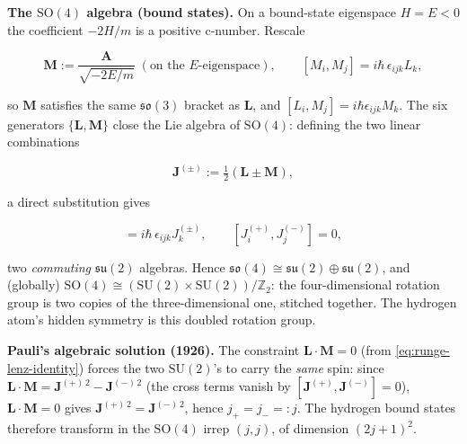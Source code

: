 \medskip\noindent\textbf{The $\mathrm{SO}(4)$ algebra (bound states).} On a bound-state eigenspace $H=E<0$ the coefficient $-2H/m$ is a positive c-number. Rescale
\begin{linenomath}
\begin{equation}
\bm M:=\frac{\bm A}{\sqrt{-2E/m}}\;(\text{on the }E\text{-eigenspace}),\qquad
[M_{i},M_{j}]=i\hbar\,\epsilon_{ijk}L_{k},
\label{eq:so4-rescale}
\end{equation}
\end{linenomath}
so $\bm M$ satisfies the same $\mathfrak{so}(3)$ bracket as $\bm L$, and $[L_{i},M_{j}]=i\hbar\epsilon_{ijk}M_{k}$. The six generators $\{\bm L,\bm M\}$ close the Lie algebra of $\mathrm{SO}(4)$: defining the two linear combinations
\begin{linenomath}
\begin{equation}
\bm J^{(\pm)}:=\tfrac12(\bm L\pm\bm M),
\label{eq:so4-decomposition}
\end{equation}
\end{linenomath}
a direct substitution gives
\begin{linenomath}
\begin{equation}
[J^{(\pm)}_{i},J^{(\pm)}_{j}]=i\hbar\,\epsilon_{ijk}J^{(\pm)}_{k},\qquad
[J^{(+)}_{i},J^{(-)}_{j}]=0,
\label{eq:so4-su2su2}
\end{equation}
\end{linenomath}
two \emph{commuting} $\mathfrak{su}(2)$ algebras. Hence $\mathfrak{so}(4)\cong\mathfrak{su}(2)\oplus\mathfrak{su}(2)$, and (globally) $\mathrm{SO}(4)\cong(\mathrm{SU}(2)\times\mathrm{SU}(2))/\mathbb Z_{2}$: the four-dimensional rotation group is two copies of the three-dimensional one, stitched together. The hydrogen atom's hidden symmetry is this doubled rotation group.

\medskip\noindent\textbf{Pauli's algebraic solution (1926).} The constraint $\bm L\!\cdot\!\bm M=0$ (from \eqref{eq:runge-lenz-identity}) forces the two $\mathrm{SU}(2)$'s to carry the \emph{same} spin: since $\bm L\!\cdot\!\bm M=\bm J^{(+)\,2}-\bm J^{(-)\,2}$ (the cross terms vanish by $[\bm J^{(+)},\bm J^{(-)}]=0$), $\bm L\!\cdot\!\bm M=0$ gives $\bm J^{(+)\,2}=\bm J^{(-)\,2}$, hence $j_{+}=j_{-}=:j$. The hydrogen bound states therefore transform in the $\mathrm{SO}(4)$ irrep $(j,j)$, of dimension $(2j+1)^{2}$.

